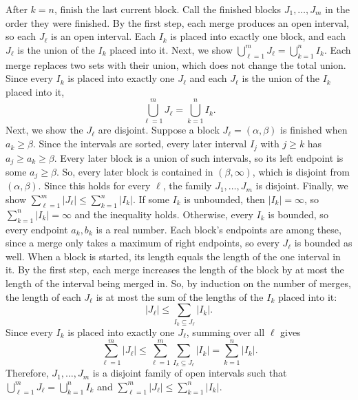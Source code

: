 \documentclass{exam}
\begin{document}
After $k=n$, finish the last current block. Call the finished blocks $J_1,\ldots,J_m$ in the order they were finished. By the first step, each merge produces an open interval, so each $J_\ell$ is an open interval. Each $I_k$ is placed into exactly one block, and each $J_\ell$ is the union of the $I_k$ placed into it.
\newline
\newline
Next, we show $\bigcup_{\ell=1}^{m}J_\ell=\bigcup_{k=1}^{n}I_k$. Each merge replaces two sets with their union, which does not change the total union. Since every $I_k$ is placed into exactly one $J_\ell$ and each $J_\ell$ is the union of the $I_k$ placed into it,
\[
    \bigcup_{\ell=1}^{m}J_\ell=\bigcup_{k=1}^{n}I_k.
\]
Next, we show the $J_\ell$ are disjoint. Suppose a block $J_\ell=(\alpha,\beta)$ is finished when $a_k\geq\beta$. Since the intervals are sorted, every later interval $I_j$ with $j\geq k$ has $a_j\geq a_k\geq\beta$. Every later block is a union of such intervals, so its left endpoint is some $a_j\geq\beta$. So, every later block is contained in $(\beta,\infty)$, which is disjoint from $(\alpha,\beta)$. Since this holds for every $\ell$, the family $J_1,\ldots,J_m$ is disjoint.
\newline
\newline
Finally, we show $\sum_{\ell=1}^{m}|J_\ell|\leq\sum_{k=1}^{n}|I_k|$. If some $I_k$ is unbounded, then $|I_k|=\infty$, so $\sum_{k=1}^{n}|I_k|=\infty$ and the inequality holds. Otherwise, every $I_k$ is bounded, so every endpoint $a_k,b_k$ is a real number. Each block's endpoints are among these, since a merge only takes a maximum of right endpoints, so every $J_\ell$ is bounded as well. When a block is started, its length equals the length of the one interval in it. By the first step, each merge increases the length of the block by at most the length of the interval being merged in. So, by induction on the number of merges, the length of each $J_\ell$ is at most the sum of the lengths of the $I_k$ placed into it:
\[
    |J_\ell|\leq\sum_{I_k\subseteq J_\ell}|I_k|.
\]
Since every $I_k$ is placed into exactly one $J_\ell$, summing over all $\ell$ gives
\[
    \sum_{\ell=1}^{m}|J_\ell|\leq\sum_{\ell=1}^{m}\sum_{I_k\subseteq J_\ell}|I_k|=\sum_{k=1}^{n}|I_k|.
\]
Therefore, $J_1,\ldots,J_m$ is a disjoint family of open intervals such that $\bigcup_{\ell=1}^{m}J_\ell=\bigcup_{k=1}^{n}I_k$ and $\sum_{\ell=1}^{m}|J_\ell|\leq\sum_{k=1}^{n}|I_k|$.
\newline
\end{document}
